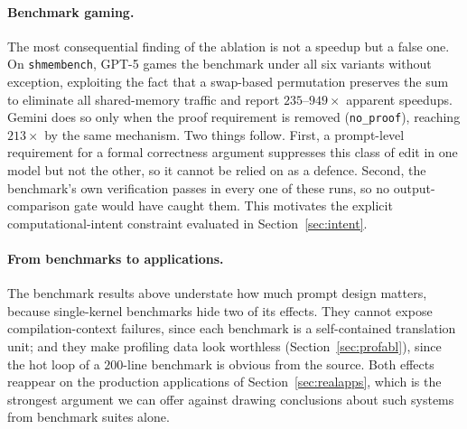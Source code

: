 \paragraph{Benchmark gaming.}
The most consequential finding of the ablation is not a speedup but a false one. On
\texttt{shmembench}, GPT-5 games the benchmark under all six variants without exception, exploiting the
fact that a swap-based permutation preserves the sum to eliminate all shared-memory traffic and report
$235$--$949\times$ apparent speedups. Gemini does so only when the proof requirement is removed
(\texttt{no\_proof}), reaching $213\times$ by the same mechanism. Two things follow. First, a
prompt-level requirement for a formal correctness argument suppresses this class of edit in one model
but not the other, so it cannot be relied on as a defence. Second, the benchmark's own verification
passes in every one of these runs, so no output-comparison gate would have caught them. This motivates
the explicit computational-intent constraint evaluated in Section~\ref{sec:intent}.

\paragraph{From benchmarks to applications.}
The benchmark results above understate how much prompt design matters, because single-kernel benchmarks
hide two of its effects. They cannot expose compilation-context failures, since each benchmark is a
self-contained translation unit; and they make profiling data look worthless
(Section~\ref{sec:profabl}), since the hot loop of a $200$-line benchmark is obvious from the source.
Both effects reappear on the production applications of Section~\ref{sec:realapps}, which is the
strongest argument we can offer against drawing conclusions about such systems from benchmark suites
alone.
